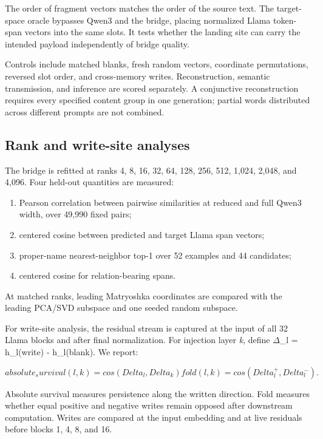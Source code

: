 \documentclass[11pt]{article}
\begin{document}
The order of fragment vectors matches the order of the source text. The
target-space oracle bypasses Qwen3 and the bridge, placing normalized Llama
token-span vectors into the same slots. It tests whether the landing site can
carry the intended payload independently of bridge quality.

Controls include matched blanks, fresh random vectors, coordinate
permutations, reversed slot order, and cross-memory writes. Reconstruction,
semantic transmission, and inference are scored separately. A conjunctive
reconstruction requires every specified content group in one generation;
partial words distributed across different prompts are not combined.

\subsection{Rank and write-site analyses}


The bridge is refitted at ranks 4, 8, 16, 32, 64, 128, 256, 512, 1,024, 2,048,
and 4,096. Four held-out quantities are measured:

\begin{enumerate}
\item Pearson correlation between pairwise similarities at reduced and full Qwen3 width, over 49,990 fixed pairs;
\item centered cosine between predicted and target Llama span vectors;
\item proper-name nearest-neighbor top-1 over 52 examples and 44 candidates;
\item centered cosine for relation-bearing spans.
\end{enumerate}


At matched ranks, leading Matryoshka coordinates are compared with the leading
PCA/SVD subspace and one seeded random subspace.

For write-site analysis, the residual stream is captured at the input of all 32
Llama blocks and after final normalization. For injection layer \emph{k}, define
$\Delta$\_l = h\_l(write) - h\_l(blank). We report:

\begin{equation*}
absolute_survival(l,k) = cos(Delta_l, Delta_k)
fold(l,k) = cos(Delta_l^+, Delta_l^-) .
\end{equation*}


Absolute survival measures persistence along the written direction. Fold
measures whether equal positive and negative writes remain opposed after
downstream computation. Writes are compared at the input embedding and at live
residuals before blocks 1, 4, 8, and 16.
\end{document}

